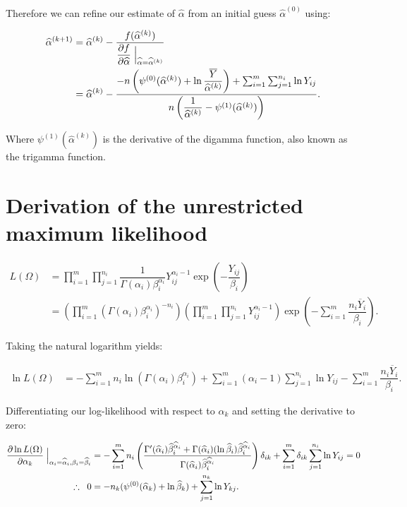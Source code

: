 \documentclass[12pt,a4paper,openright]{article}
\newcommand{\ovY}{\overline{Y}}
\newcommand{\wal}{\widehat{\alpha}}
\newcommand{\wbe}{\widehat{\beta}}
\begin{document}
	Therefore we can refine our estimate of $\wal$ from an initial guess $\wal^{(0)}$ using:
	
	\begin{align*}
		\wal^{(k+1)} &= \wal^{(k)} - \dfrac{f(\wal^{(k)})}{\dfrac{\partial f}{\partial \wal}\Bigm\lvert_{\wal=\wal^{(k)}}} \\
		&= \wal^{(k)} - \dfrac{-n\left(\psi^{(0)}(\wal^{(k)})+\ln{\dfrac{\ovY}{\wal^{(k)}}}\right) + \sum_{i=1}^{m} \sum_{j=1}^{n_i} \ln{Y_{ij}}}{n\left(\dfrac{1}{\wal^{(k)}} - \psi^{(1)}(\wal^{(k)})\right)}.
	\end{align*}

	Where $\psi^{(1)}(\wal^{(k)})$ is the derivative of the digamma function, also known as the trigamma function.

	\section{Derivation of the unrestricted maximum likelihood}
	\begin{align}
		L(\Omega) &= \prod_{i=1}^m \prod_{j=1}^{n_i} \dfrac{1}{\Gamma(\alpha_i)\beta_i^{\alpha_i}} Y_{ij}^{\alpha_i-1} \exp{\left(-\dfrac{Y_{ij}}{\beta_i}\right)} \nonumber \\
		&= \left(\prod_{i=1}^m\left(\Gamma(\alpha_i)\beta_i^{\alpha_i}\right)^{-n_i}\right) \left(\prod_{i=1}^m \prod_{j=1}^{n_i} Y_{ij}^{\alpha_i-1}\right) \exp\left(-\sum_{i=1}^m \dfrac{n_i\ovY_i}{\beta_i}\right). \label{LikUnr}
	\end{align}

	Taking the natural logarithm yields:
	
	\begin{align*}
		\ln{L(\Omega)} &= -\sum_{i=1}^m n_i\ln{\left(\Gamma(\alpha_i)\beta_i^{\alpha_i}\right)} + \sum_{i=1}^m (\alpha_i-1)\sum_{j=1}^{n_i}\ln{Y_{ij}} - \sum_{i=1}^m \dfrac{n_i\ovY_i}{\beta_i}. 
	\end{align*}

	Differentiating our log-likelihood with respect to $\alpha_k$ and setting the derivative to zero:
	
	\begin{align}
		\dfrac{\partial \ln{L(\Omega)}}{\partial \alpha_k} \Bigm \lvert_{\alpha_i=\wal_i, \beta_i=\wbe_i} &= -\sum_{i=1}^m n_i \left(\dfrac{\Gamma'(\wal_i)\wbe_i^{\wal_i} + \Gamma(\wal_i)(\ln{\wbe_i})\wbe_i^{\wal_i}}{\Gamma(\wal_i)\wbe_i^{\wal_i}}\right)\delta_{ik} + \sum_{i=1}^m \delta_{ik} \sum_{j=1}^{n_i} \ln{Y_{ij}} =0 \nonumber\\
		\therefore \hspace{0.2cm} 0 &= -n_k(\psi^{(0)}(\wal_k)+\ln{\wbe_k}) + \sum_{j=1}^{n_k}\ln{Y_{kj}}. \label{MLEUnrAlpha}
	\end{align}
\end{document}
